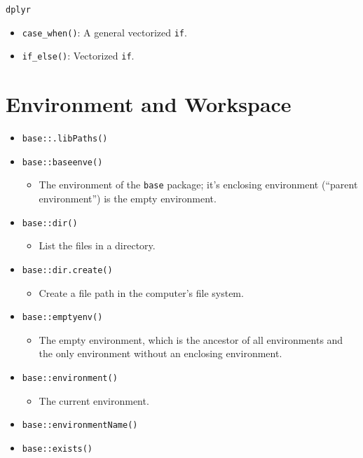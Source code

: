 \documentclass[
]{book}
\providecommand{\tightlist}{%
  \setlength{\itemsep}{0pt}\setlength{\parskip}{0pt}}
\begin{document}
\texttt{dplyr}

\begin{itemize}
\tightlist
\item
  \texttt{case\_when()}: A general vectorized \texttt{if}.
\item
  \texttt{if\_else()}: Vectorized \texttt{if}.
\end{itemize}

\hypertarget{environment-and-workspace}{%
\section{Environment and Workspace}\label{environment-and-workspace}}

\begin{itemize}
\tightlist
\item
  \texttt{base::.libPaths()}
\item
  \texttt{base::baseenve()}

  \begin{itemize}
  \tightlist
  \item
    The environment of the \texttt{base} package; it's enclosing environment (``parent environment'') is the empty environment.
  \end{itemize}
\item
  \texttt{base::dir()}

  \begin{itemize}
  \tightlist
  \item
    List the files in a directory.
  \end{itemize}
\item
  \texttt{base::dir.create()}

  \begin{itemize}
  \tightlist
  \item
    Create a file path in the computer's file system.
  \end{itemize}
\item
  \texttt{base::emptyenv()}

  \begin{itemize}
  \tightlist
  \item
    The empty environment, which is the ancestor of all environments and the only environment without an enclosing environment.
  \end{itemize}
\item
  \texttt{base::environment()}

  \begin{itemize}
  \tightlist
  \item
    The current environment.
  \end{itemize}
\item
  \texttt{base::environmentName()}
\item
  \texttt{base::exists()}


\end{itemize}
\end{document}
